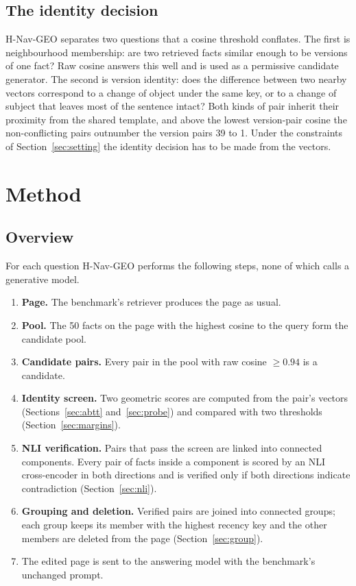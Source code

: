 \documentclass[journal=jcisd8,manuscript=article]{achemso}
\newcommand{\geo}{H-Nav-GEO}
\begin{document}
\subsection{The identity decision}
\label{sec:identity}

\geo{} separates two questions that a cosine threshold conflates. The first is neighbourhood membership: are two retrieved facts similar enough to be versions of one fact? Raw cosine answers this well and is used as a permissive candidate generator. The second is version identity: does the difference between two nearby vectors correspond to a change of object under the same key, or to a change of subject that leaves most of the sentence intact? Both kinds of pair inherit their proximity from the shared template, and above the lowest version-pair cosine the non-conflicting pairs outnumber the version pairs 39 to 1. Under the constraints of Section~\ref{sec:setting} the identity decision has to be made from the vectors.

\section{Method}
\label{sec:method}

\subsection{Overview}
\label{sec:overview}

For each question \geo{} performs the following steps, none of which calls a generative model.
\begin{enumerate}
\item \textbf{Page.} The benchmark's retriever produces the page as usual.
\item \textbf{Pool.} The 50 facts on the page with the highest cosine to the query form the candidate pool.
\item \textbf{Candidate pairs.} Every pair in the pool with raw cosine $\ge 0.94$ is a candidate.
\item \textbf{Identity screen.} Two geometric scores are computed from the pair's vectors (Sections~\ref{sec:abtt} and~\ref{sec:probe}) and compared with two thresholds (Section~\ref{sec:margins}).
\item \textbf{NLI verification.} Pairs that pass the screen are linked into connected components. Every pair of facts inside a component is scored by an NLI cross-encoder in both directions and is verified only if both directions indicate contradiction (Section~\ref{sec:nli}).
\item \textbf{Grouping and deletion.} Verified pairs are joined into connected groups; each group keeps its member with the highest recency key and the other members are deleted from the page (Section~\ref{sec:group}).
\item The edited page is sent to the answering model with the benchmark's unchanged prompt.
\end{enumerate}
\end{document}
